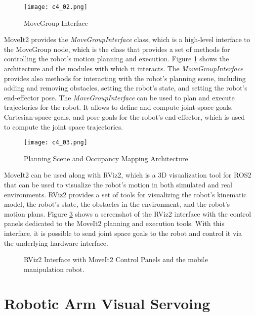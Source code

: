 \begin{figure}[t]
    \centering
    \texttt{[image: c4\_02.png]}
    \caption{MoveGroup Interface}
    \label{fig:move_group}
\end{figure}

MoveIt2 provides the \textit{MoveGroupInterface} class, which is a high-level interface to the MoveGroup node, which is the
class that provides a set of methods for controlling the robot's motion planning and execution. 
Figure \ref{fig:move_group} shows the architecture and the modules with which it interacts.
The \textit{MoveGroupInterface} provides also methods for interacting with the robot's planning scene, 
including adding and removing obstacles, setting the robot's state, and setting the robot's end-effector pose. 
The \textit{MoveGroupInterface} can be used to plan and execute trajectories for the robot. 
It allows to define and compute joint-space goals, Cartesian-space goals,
and pose goals for the robot's end-effector, which is used to compute the joint space trajectories.

\begin{figure}[t]
    \centering
    \texttt{[image: c4\_03.png]}
    \caption{Planning Scene and Occupancy Mapping Architecture}
    \label{fig:planninscence}
\end{figure}

MoveIt2 can be used along with RViz2, which is a 3D visualization tool for ROS2 that can be used to visualize the
robot's motion in both simulated and real environments. RViz2 provides a set of tools for visualizing the robot's
kinematic model, the robot's state, the obstacles in the environment, and the robot's motion plans.
Figure \ref{fig:rviz2} shows a screenshot of the RViz2 interface with the control panels dedicated to the MoveIt2
planning and execution tools. With this interface, it is possible to send joint space goals to the robot
and control it via the underlying hardware interface.

\begin{figure}[t]
    \centering
    \caption{RViz2 Interface with MoveIt2 Control Panels and the mobile manipulation robot.}
    \label{fig:rviz2}
\end{figure}

\section{Robotic Arm Visual Servoing}

